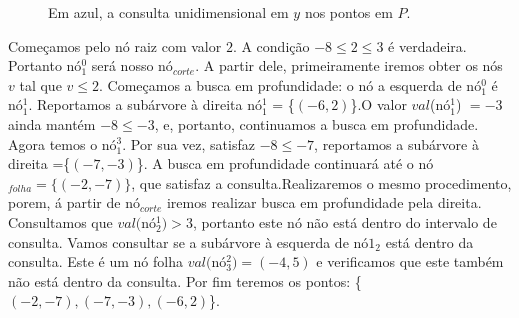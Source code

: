 \begin{figure}[h!]
\centering
    \caption {Em azul, a consulta unidimensional em $y$ nos pontos em $P$.}
\label{fig:query_y_range_tree}
\end{figure}


Começamos pelo nó raiz com valor $2$. A condição $-8 \leq 2 \leq 3$ é verdadeira. Portanto nó$^0_1$ será nosso nó$_{corte}$. A partir dele, primeiramente iremos obter os nós $v$ tal que $v \leq 2$. Começamos a busca em profundidade: o nó a esquerda de nó$^0_1$ é nó$^1_1$. Reportamos a subárvore à direita nó$^1_1$ = \{$(-6,2)$\}.O valor $val$(nó$^1_1$) $= -3$ ainda mantém $-8 \leq -3$, e, portanto, continuamos a busca em profundidade. Agora temos o nó$^3_1$. Por sua vez, satisfaz  $-8 \leq -7$, reportamos a subárvore à direita =\{$(-7, -3)$\}.
A busca em profundidade continuará até o nó$_{folha}=\{(-2,-7)\}$, que satisfaz a consulta.Realizaremos o mesmo procedimento, porem, á partir de nó$_{corte}$ iremos realizar busca em profundidade pela direita. Consultamos que $val($nó$^1_2) > 3$, portanto este nó não está dentro do intervalo de consulta. Vamos consultar se a subárvore à esquerda de nó$1_2$ está dentro da consulta. Este é um nó folha $val($nó$^2_3) = (-4,5)$ e verificamos que este também não está dentro da consulta.  Por fim teremos os pontos: \{$(-2,-7), (-7,-3), (-6,2)$\}.



